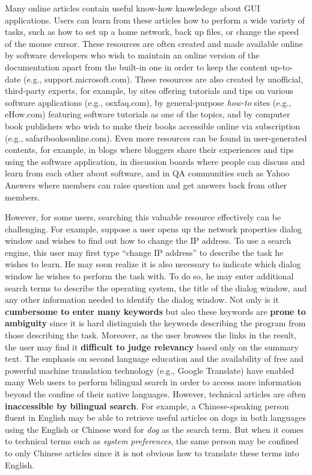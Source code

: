 \documentclass{www2010-submission}
\begin{document}
Many online articles contain useful know-how knowledege about GUI
applications. Users can learn from these articles how to perform a
wide variety of tasks, such as how to set up a home network, back up
files, or change the speed of the mouse cursor. These resources are
often created and made available online by software developers who
wish to maintain an online version of the documentation apart from the
built-in one in order to keep the content up-to-date (e.g.,
support.microsoft.com). These resources are also created by
unofficial, third-party experts, for example, by sites offering
tutorials and tips on various software applications (e.g.,
osxfaq.com), by general-purpose \emph{how-to} sites (e.g., eHow.com)
featuring software tutorials as one of the topics, and by computer
book publishers who wish to make their books accessible online via
subscription (e.g., safaribooksonline.com). Even more resources can be
found in user-generated contents, for example, in blogs where bloggers
share their experiences and tips using the software application, in
discussion boards where people can discuss and learn from each other
about software, and in QA communities such as Yahoo Answers where
members can raise question and get answers back from other members.

However, for some users, searching this valuable resource
effectively can be challenging. For example, suppose a user opens
up the network properties dialog window and wishes to find out how
to change the IP address. To use a search engine, this user may
first type ``change IP address'' to describe the task he wishes to
learn. He may soon realize it is also necessary to indicate which
dialog window he wishes to perform the task with. To do so, he may
enter additional search terms to describe the operating system,
the title of the dialog window, and any other information needed
to identify the dialog window. Not only is it \textbf{cumbersome
to enter many keywords} but also these keywords are \textbf{prone
to ambiguity} since it is hard distinguish the keywords describing
the program from those describing the task. Moreover, as the user
browses the links in the result, the user may find it
\textbf{difficult to judge relevancy} based only on the summary
text. The emphasis on second language education and the
availability of free and powerful machine translation technology
(e.g., Google Translate) have enabled many Web users to perform
bilingual search in order to access more information beyond the
confine of their native languages. However, technical articles are
often \textbf{inaccessible by bilingual search}. For example, a
Chinese-speaking person fluent in English may be able to retrieve
useful articles on dogs in both languages using the English or
Chinese word for \emph{dog} as the search term. But when it comes
to technical terms such as \emph{system preferences}, the same
person may be confined to only Chinese articles since it is not
obvious how to translate these terms into English.
\end{document}
